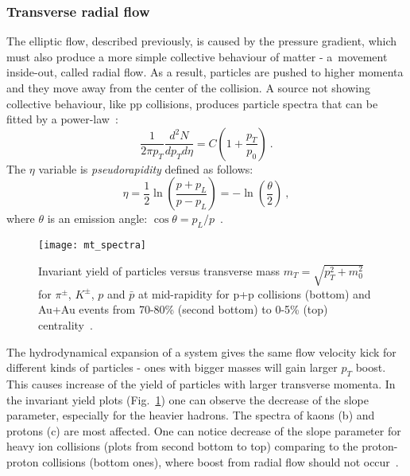       \subsubsection{Transverse radial flow}
        The elliptic flow, described previously, is caused by the pressure gradient, which must also produce a more simple collective behaviour of matter - a~movement inside-out, called radial flow.
        As a result, particles are pushed to higher momenta and they move away from the center of the collision.
        A source not showing collective behaviour, like pp collisions, produces particle spectra that can be fitted by a power-law~\cite{drkisiel}:
        \begin{equation}
          \frac{1}{2\pi p_T} \frac{d^2 N}{d p_T d \eta} = C \left( 1 +\frac{p_T}{p_0} \right)~.
        \end{equation}
        The $\eta$ variable is \textit{pseudorapidity} defined as follows:
        \begin{equation}
          \eta = \frac{1}{2} \ln \left( \frac{p + p_L}{p - p_L} \right) = -\ln \left(\frac{\theta}{2} \right)~,
        \end{equation}
        where $\theta$ is an emission angle: $\cos \theta = p_L / p$~.
        \begin{figure}[b]
          \centering
          \texttt{[image: mt\_spectra]}
          \caption{Invariant yield of particles versus transverse mass $m_T = \sqrt{p^2_T + m_0^2}$ for $\pi^{\pm}$, $K^{\pm}$, $p$ and $\bar{p}$ at mid-rapidity for p+p collisions (bottom) and Au+Au events from 70-80\% (second bottom) to 0-5\% (top) centrality~\cite{mtspectra}.}
          \label{fig:invariant_yield}
        \end{figure}

        The hydrodynamical expansion of a system gives the same flow velocity kick for different kinds of particles - ones with bigger masses will gain larger $p_T$ boost.
        This causes increase of the yield of particles with larger transverse momenta.
        In the invariant yield plots (Fig.~\ref{fig:invariant_yield}) one can observe the decrease of the slope parameter, especially for the heavier hadrons.
        The spectra of kaons (b) and protons (c) are most affected.
        One can notice decrease of the slope parameter for heavy ion collisions (plots from second bottom to top) comparing to the proton-proton collisions (bottom ones), where boost from radial flow should not occur~\cite{drkisiel}.

